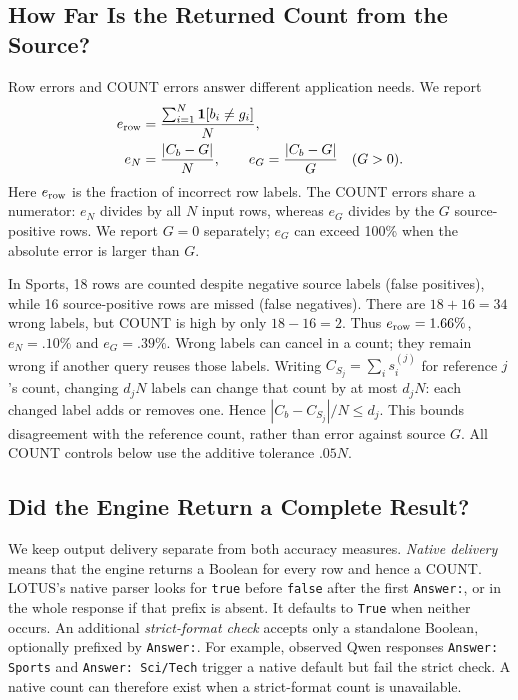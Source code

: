 \subsection{How Far Is the Returned Count from the Source?}
Row errors and COUNT errors answer different application needs. We report
\begin{equation}
\begin{aligned}
e_{\rm row}&=\frac{\sum_{i=1}^{N}\mathbf{1}[b_i\ne g_i]}{N},\\
e_N&=\frac{|C_b-G|}{N},\qquad e_G=\frac{|C_b-G|}{G}\quad(G>0).
\end{aligned}
\label{eq:task}
\end{equation}
Here $e_{\rm row}$ is the fraction of incorrect row labels. The COUNT errors share a numerator: $e_N$ divides by all $N$ input rows, whereas $e_G$ divides by the $G$ source-positive rows. We report $G=0$ separately; $e_G$ can exceed 100\% when the absolute error is larger than $G$.

In Sports, 18 rows are counted despite negative source labels (false positives), while 16 source-positive rows are missed (false negatives). There are $18+16=34$ wrong labels, but COUNT is high by only $18-16=2$. Thus $e_{\rm row}=1.66\%$, $e_N=.10\%$ and $e_G=.39\%$. Wrong labels can cancel in a count; they remain wrong if another query reuses those labels. Writing $C_{S_j}=\sum_i s_i^{(j)}$ for reference $j$'s count, changing $d_jN$ labels can change that count by at most $d_jN$: each changed label adds or removes one. Hence $|C_b-C_{S_j}|/N\le d_j$. This bounds disagreement with the reference count, rather than error against source $G$. All COUNT controls below use the additive tolerance $.05N$.

\subsection{Did the Engine Return a Complete Result?}
We keep output delivery separate from both accuracy measures. \emph{Native delivery} means that the engine returns a Boolean for every row and hence a COUNT. LOTUS's native parser looks for \texttt{true} before \texttt{false} after the first \texttt{Answer:}, or in the whole response if that prefix is absent. It defaults to \texttt{True} when neither occurs. An additional \emph{strict-format check} accepts only a standalone Boolean, optionally prefixed by \texttt{Answer:}. For example, observed Qwen responses \texttt{Answer: Sports} and \texttt{Answer: Sci/Tech} trigger a native default but fail the strict check. A native count can therefore exist when a strict-format count is unavailable.

